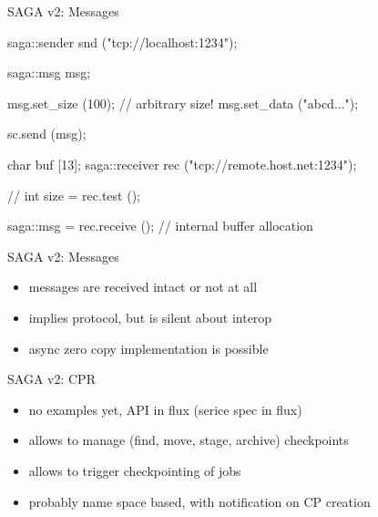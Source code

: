 \documentclass[%
  pdf,
  colorBG,
  slideColor,
  frames,
  ogf
]{prosper}
\newcommand{\dn}{\vspace*{+1em}}
\begin{document}
 \begin{slide}{SAGA v2: Messages}

  \begin{mycode}[label=Messaging\, server]
  saga::sender snd ("tcp://localhost:1234");

  saga::msg msg;

  msg.set_size (100); // arbitrary size!
  msg.set_data ("abcd...");

  sc.send (msg);
  \end{mycode}

  \dn

  \begin{mycode}[label=Messaging\, client]
  char buf [13];
  saga::receiver rec ("tcp://remote.host.net:1234");

  // int size = rec.test ();
  
  saga::msg = rec.receive (); // internal buffer allocation
  \end{mycode}
   
 \end{slide}


 \begin{slide}{SAGA v2: Messages}
 \dn
  \begin{itemize}
   \item messages are received intact or not at all
   \item implies protocol, but is silent about interop
   \item async zero copy implementation is possible
  \end{itemize}
 \end{slide}


 \begin{slide}{SAGA v2: CPR}
 \dn
  \begin{itemize}
   \item no examples yet, API in flux (serice spec in flux)
   \item allows to manage (find, move, stage, archive) checkpoints
   \item allows to trigger checkpointing of jobs
   \item probably name space based, with notification on CP creation
  \end{itemize}
 \end{slide}

\end{document}

